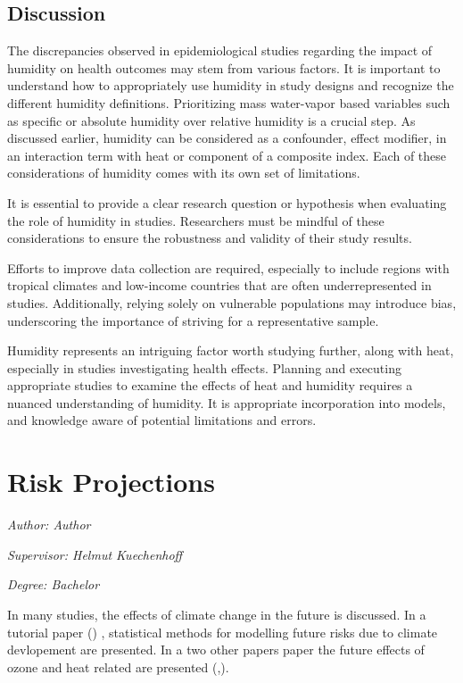 \documentclass[
]{krantz}
\begin{document}
\section{Discussion}\label{discussion-2}

The discrepancies observed in epidemiological studies regarding the impact of humidity on health outcomes may stem from various factors. It is important to understand how to appropriately use humidity in study designs and recognize the different humidity definitions. Prioritizing mass water-vapor based variables such as specific or absolute humidity over relative humidity is a crucial step.
As discussed earlier, humidity can be considered as a confounder, effect modifier, in an interaction term with heat or component of a composite index. Each of these considerations of humidity comes with its own set of limitations.

It is essential to provide a clear research question or hypothesis when evaluating the role of humidity in studies. Researchers must be mindful of these considerations to ensure the robustness and validity of their study results.

Efforts to improve data collection are required, especially to include regions with tropical climates and low-income countries that are often underrepresented in studies. Additionally, relying solely on vulnerable populations may introduce bias, underscoring the importance of striving for a representative sample.

Humidity represents an intriguing factor worth studying further, along with heat, especially in studies investigating health effects. Planning and executing appropriate studies to examine the effects of heat and humidity requires a nuanced understanding of humidity. It is appropriate incorporation into models, and knowledge aware of potential limitations and errors.

\chapter{Risk Projections}\label{he4}

\emph{Author: Author}

\emph{Supervisor: Helmut Kuechenhoff}

\emph{Degree: Bachelor}

In many studies, the effects of climate change in the future is discussed.
In a tutorial paper (\citet{vicedo}) , statistical methods for modelling future risks due to climate devlopement are presented. In a two other papers paper the future effects of ozone and heat related are presented (\citet{domingo},\citet{chen}).
\end{document}
